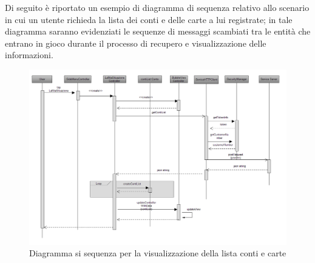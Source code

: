 Di seguito è riportato un esempio di diagramma di sequenza relativo allo scenario in cui un utente richieda la lista dei conti e delle carte a lui registrate; in tale diagramma saranno evidenziati le sequenze di messaggi scambiati tra le entità che entrano in gioco durante il processo di recupero e visualizzazione delle informazioni. 
 \begin{landscape}
\begin{figure}[!htbp]
\centering
\includegraphics[scale=0.65]{architettura/sequence.png}
\caption{Diagramma si sequenza per la visualizzazione della lista conti e carte}
\end{figure}
\end{landscape}